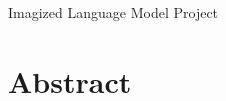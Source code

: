 \documentclass[12pt,a4paper]{article}
\begin{document}
{\sffamily\bfseries\Large\PaperTitle\par}\medskip Imagized Language Model Project\par\medskip
\section*{Abstract}\PaperSummary\par\bigskip

\end{document}
